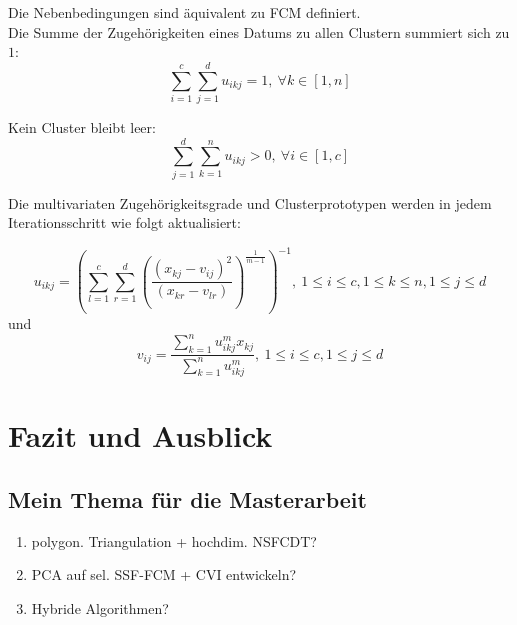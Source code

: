 \documentclass[11pt,ceqn]{book}
\begin{document}
Die Nebenbedingungen sind äquivalent zu FCM definiert.\\
Die Summe der Zugehörigkeiten eines Datums zu allen Clustern summiert sich zu $1$:
$$\sum_{i=1}^c\sum_{j=1}^d u_{ikj}= 1,\ \forall k\in \left[1,n\right]$$

Kein Cluster bleibt leer:
$$\sum_{j=1}^d\sum_{k=1}^n u_{ikj}> 0,\ \forall i\in \left[1,c\right]$$ 

Die multivariaten Zugehörigkeitsgrade und Clusterprototypen werden
in jedem Iterationsschritt wie folgt aktualisiert:

$$u_{ikj} = \left(\sum_{l=1}^c \sum_{r=1}^d \left(\frac{(x_{kj}-v_{ij})^2}{(x_{kr}-v_{lr})}\right)^{\frac{1}{m-1}}\right)^{-1},\ 1\leqslant i \leqslant c,1\leqslant k\leqslant n, 1\leqslant j\leqslant d$$
und
$$v_{ij} = \frac{\sum\limits_{k=1}^n u_{ikj}^m x_{kj}}{\sum\limits_{k=1}^n u_{ikj}^m},\ 1\leqslant i\leqslant c,1\leqslant j\leqslant d$$


\chapter{Fazit und Ausblick}
\section{Mein Thema für die Masterarbeit}
\begin{enumerate}
\item polygon. Triangulation + hochdim. NSFCDT?
\item PCA auf sel. SSF-FCM + CVI entwickeln?
\item Hybride Algorithmen?

\end{enumerate}

\printbibliography

\renewcommand\appendixname{Anhang}
\renewcommand\appendixpagename{Anhang}
\appendixpage
\begin{appendices}



\end{appendices}
\end{document}
